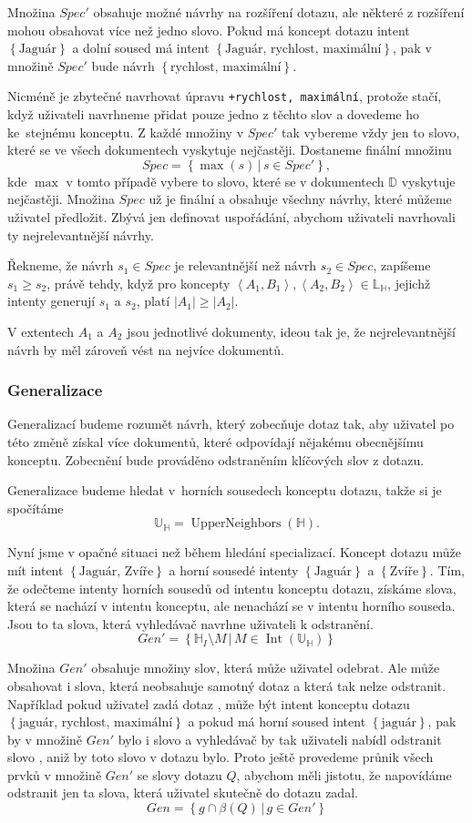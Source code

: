 \documentclass{article}
\newcommand{\code}[1]{\texttt{#1}}
\newcommand{\sep}{\,|\,}
\newcommand{\sssection}[1]{\subsubsection{#1}}
\newcommand{\adds}[1]{\left\{#1\right\}}
\newcommand{\addsp}[1]{\left<#1\right>}
\DeclareMathOperator{\intfca}{Int}
\DeclareMathOperator{\upperneighbors}{UpperNeighbors}
\newcommand{\alldoc}{\mathbb{D}}
\newcommand{\hledany}{\mathbb{H}}
\newcommand{\lowerc}{\mathbb{L}}
\newcommand{\upperc}{\mathbb{U}}
\begin{document}
Množina $Spec'$ obsahuje možné návrhy na rozšíření dotazu, ale některé z rozšíření mohou obsahovat více než jedno slovo. Pokud má koncept dotazu intent $\adds{\mbox{Jaguár}}$ a dolní soused má intent $\adds{\mbox{Jaguár, rychlost, maximální}}$, pak v množině $Spec'$ bude návrh $\adds{\mbox{rychlost, maximální}}$. 

Nicméně je zbytečné navrhovat úpravu \code{+rychlost, maximální}, protože stačí, když uživateli navrhneme přidat pouze jedno z těchto slov a dovedeme ho ke~stejnému konceptu. Z každé množiny v $Spec'$ tak vybereme vždy jen to slovo, které se ve všech dokumentech vyskytuje nejčastěji. Dostaneme finální množinu
$$
Spec=\adds{\max(s)\sep s\in Spec'},
$$
kde $\max$ v tomto případě vybere to slovo, které se v dokumentech $\alldoc$ vyskytuje nejčastěji. Množina $Spec$ už je finální a obsahuje všechny návrhy, které můžeme uživatel předložit. Zbývá jen definovat uspořádání, abychom uživateli navrhovali ty nejrelevantnější návrhy. 

Řekneme, že návrh $s_1 \in Spec$ je relevantnější než návrh $s_2 \in Spec$, zapíšeme $s_1 \ge s_2$, právě tehdy, když pro koncepty $\addsp{A_1, B_1}, \addsp{A_2, B_2} \in \lowerc_\hledany$, jejichž intenty generují $s_1$ a $s_2$, platí $|A_1|\ge|A_2|$. 

V extentech $A_1$ a $A_2$ jsou jednotlivé dokumenty, ideou tak je, že nejrelevantnější návrh by měl zároveň vést na nejvíce dokumentů. 

\sssection{Generalizace}
Generalizací budeme rozumět návrh, který zobecňuje dotaz tak, aby uživatel po této změně získal více dokumentů, které odpovídají nějakému obecnějšímu konceptu. Zobecnění bude prováděno odstraněním klíčových slov z dotazu. 

Generalizace budeme hledat v~horních sousedech konceptu dotazu, takže si je spočítáme
$$
\upperc_\hledany=\upperneighbors(\hledany).
$$

Nyní jsme v opačné situaci než během hledání specializací. Koncept dotazu může mít intent $\adds{\mbox{Jaguár, Zvíře}}$ a horní sousedé intenty $\adds{\mbox{Jaguár}}$ a $\adds{\mbox{Zvíře}}$. Tím, že odečteme intenty horních sousedů od intentu konceptu dotazu, získáme slova, která se nachází v intentu konceptu, ale nenachází se v intentu horního souseda. Jsou to ta slova, která vyhledávač navrhne uživateli k odstranění. 
$$
Gen'=\adds{\hledany_I\setminus M\sep M\in\intfca(\upperc_\hledany)}
$$

Množina $Gen'$ obsahuje množiny slov, která může uživatel odebrat. Ale může obsahovat i slova, která neobsahuje samotný dotaz a která tak nelze odstranit. Například pokud uživatel zadá dotaz , může být intent konceptu dotazu $\adds{\mbox{jaguár, rychlost, maximální}}$ a pokud má horní soused intent $\adds{\mbox{jaguár}}$, pak by v množině $Gen'$ bylo i slovo  a vyhledávač by tak uživateli nabídl odstranit slovo , aniž by toto slovo v dotazu bylo. Proto ještě provedeme průnik všech prvků v množině $Gen'$ se slovy dotazu $Q$, abychom měli jistotu, že napovídáme odstranit jen ta slova, která uživatel skutečně do dotazu zadal.
$$
Gen=\adds{g\cap\beta(Q)\sep g\in Gen'}
$$
\end{document}
